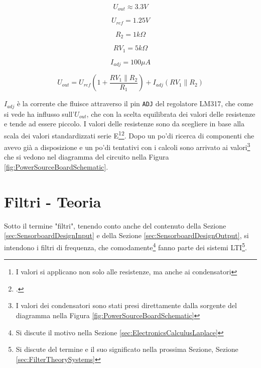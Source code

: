 \documentclass[a4paper, 10pt, final]{article} %
\begin{document}
    \begin{figure}[H]
        \centering
        \begin{minipage}[H]{.15\linewidth}
            \[U_{out} \approx 3.3V\]
        \end{minipage}
        \begin{minipage}[H]{.15\linewidth}
            \[U_{ref}=1.25V\]
        \end{minipage}
        \begin{minipage}[H]{.15\linewidth}
            \[R_2=1k\Omega\]
        \end{minipage}
        \begin{minipage}[H]{.15\linewidth}
            \[RV_1=5k\Omega\]
        \end{minipage}
        \begin{minipage}[H]{.15\linewidth}
            \[I_{adj}=100\mu A\]
        \end{minipage}
        \begin{minipage}[H]{\linewidth}
            \vspace{3ex}
            \[U_{out}=U_{ref}\left(1+\frac{RV_1 \parallel R_2}{R_1}\right)+I_{adj} \left(RV_1 \parallel R_2\right)\]
        \end{minipage}
    \end{figure} 
    \noindent $I_{adj}$ \`{e} la corrente che fluisce attraverso il pin \texttt{ADJ} del regolatore LM317, che come si vede ha influsso sull'$U_{out}$, che con la scelta equilibrata dei valori delle resistenze e tende ad essere piccolo.
    I valori delle resistenze sono da scegliere in base alla scala dei valori standardizzati serie E\footnote{I valori si applicano non solo alle resistenze, ma anche ai condensatori}\:\footcite[]{ESeries:Wiki}.
    Dopo un po'di ricerca di componenti che avevo gi\`{a} a disposizione e un po'di tentativi con i calcoli sono arrivato ai valori\footnote{I valori dei condensatori sono stati presi direttamente dalla sorgente del diagramma nella Figura \ref{fig:PowerSourceBoardSchematic}} che si vedono nel diagramma del circuito nella Figura \ref{fig:PowerSourceBoardSchematic}.
    \clearpage

    \section{Filtri - Teoria}\label{sec:FilterTheory}
    Sotto il termine "filtri", tenendo conto anche del contenuto della Sezione \ref{sec:SensorboardDesignInput} e della Sezione \ref{sec:SensorboardDesignOutput}, si intendono i filtri di frequenza, che comodamente\footnote{Si discute il motivo nella Sezione \ref{sec:ElectronicsCalculusLaplace}} fanno parte dei sistemi LTI\footnote{Si discute del termine e il suo significato nella prossima Sezione, Sezione \ref{sec:FilterTheorySystems}}.
\end{document}
